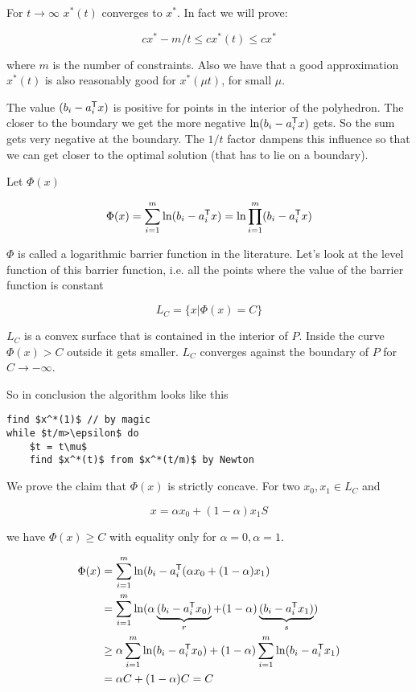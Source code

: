 For $t\rightarrow \infty$ $x^*(t)$ converges to $x^*$. In fact we will prove:

\[cx^* -m/t \leq cx^*(t) \leq cx^*\]

where $m$ is the number of constraints. Also we have that a good approximation $x^*(t)$ is also reasonably good for $x^*(\mu t)$, for small $\mu$.

The value $(b_i-{a}^\text{\upshape \sffamily T}_i x)$ is positive for points in the interior of the polyhedron. The closer to the boundary we get the more negative $\ln (b_i-{a}^\text{\upshape \sffamily T}_i x)$ gets. So the sum gets very negative at the boundary. The $1/t$ factor dampens this influence so that we can get closer to the optimal solution (that has to lie on a boundary).

Let $\Phi(x)$

\[\Phi(x) = \sum_{i=1}^m \ln (b_i-{a}^\text{\upshape \sffamily T}_ix) = \ln \prod_{i=1}^m (b_i-{a}^\text{\upshape \sffamily T}_i x)\]

$\Phi$ is called a logarithmic barrier function in the literature. Let's look at the level function of this barrier function, i.e. all the points where the value of the barrier function is constant

\[L_C=\{x|\Phi(x)=C\}\]


$L_C$ is a convex surface that is contained in the interior of $P$. Inside the curve $\Phi(x)>C$ outside it gets smaller. $L_C$ converges against the boundary of $P$ for $C\rightarrow -\infty$. %

So in conclusion the algorithm looks like this

\begin{lstlisting}
find $x^*(1)$ // by magic
while $t/m>\epsilon$ do
	$t = t\mu$
	find $x^*(t)$ from $x^*(t/m)$ by Newton
\end{lstlisting}

We prove the claim that $\Phi(x)$ is strictly concave. For two $x_0,x_1\in L_C$ and

\[x=\alpha x_0+(1-\alpha)x_1S\]

we have $\Phi(x)\geq C$ with equality only for $\alpha=0, \alpha=1$.

\begin{align*}
\Phi(x) &= \sum_{i=1}^m\ln (b_i - {a}^\text{\upshape \sffamily T}_i (\alpha x_0+(1-\alpha)x_1)\\
	&= \sum_{i=1}^m\ln (\alpha\underbrace{(b_i-{a}^\text{\upshape \sffamily T}_i x_0)}_r +(1-\alpha) \underbrace{(b_i-{a}^\text{\upshape \sffamily T}_i x_1)}_s)\\
	&\geq \alpha \sum_{i=1}^m \ln (b_i-{a}^\text{\upshape \sffamily T}_i x_0) + (1-\alpha)\sum_{i=1}^m \ln (b_i-{a}^\text{\upshape \sffamily T}_i x_1)\\
	&=\alpha C +(1-\alpha)C = C
\end{align*}

